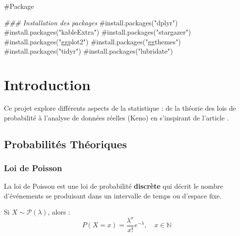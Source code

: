 \documentclass{article}
\newenvironment{Shaded}{\begin{snugshade}}{\end{snugshade}}
\newcommand{\CommentTok}[1]{\textcolor[rgb]{0.37,0.37,0.37}{#1}}
\newcommand{\DocumentationTok}[1]{\textcolor[rgb]{0.37,0.37,0.37}{\textit{#1}}}
\begin{document}
\setcounter{page}{1}
\pagestyle{fancy}

\#Package

\begin{Shaded}
\begin{Highlighting}[]
\DocumentationTok{\#\#\# Installation des packages}
\CommentTok{\#install.packages("dplyr")}
\CommentTok{\#install.packages("kableExtra")}
\CommentTok{\#install.packages("stargazer")}
\CommentTok{\#install.packages("ggplot2")}
\CommentTok{\#install.packages("ggthemes")}
\CommentTok{\#install.packages("tidyr")}
\CommentTok{\#install.packages("lubridate")}
\end{Highlighting}
\end{Shaded}

\section{Introduction}\label{introduction}

Ce projet explore différents aspects de la statistique : de la théorie
des lois de probabilité à l'analyse de données réelles (Keno) en
s'inspirant de l'article \autocite{Evans2024}.

\subsection{Probabilités
Théoriques}\label{probabilituxe9s-thuxe9oriques}

\subsubsection{Loi de Poisson}\label{loi-de-poisson}

La loi de Poisson est une loi de probabilité \textbf{discrète} qui
décrit le nombre d'événements se produisant dans un intervalle de temps
ou d'espace fixe.

Si \(X \sim \mathcal{P}(\lambda)\), alors :
\[P(X=x)=\frac{\lambda^x}{x!}e^{-\lambda}, \quad x \in \mathbb{N}\]
\end{document}
